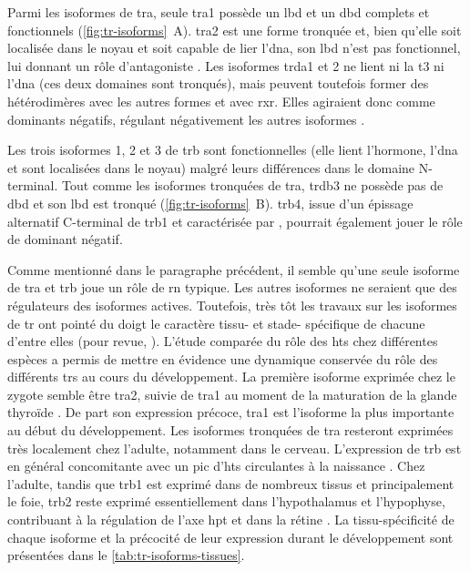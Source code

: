 \documentclass[../main.tex]{subfiles}
\begin{document}
Parmi les isoformes de \gls{tra}, seule \gls{tra}1 possède un \gls{lbd} et un \gls{dbd} complets et fonctionnels (\autoref{fig:tr-isoforms}~A).
\gls{tra}2 est une forme tronquée et, bien qu'elle soit localisée dans le noyau et soit capable de lier l'\gls{dna}, son \gls{lbd} n'est pas fonctionnel, lui donnant un rôle d'antagoniste \citep{Chassande1997}.
Les isoformes \gls{trda}1 et 2 ne lient ni la \gls{t3} ni l'\gls{dna} (ces deux domaines sont tronqués), mais peuvent toutefois former des hétérodimères avec les autres formes et avec \gls{rxr}.
Elles agiraient donc comme dominants négatifs, régulant négativement les autres isoformes \citep{Plateroti2001}.



Les trois isoformes 1, 2 et 3 de \gls{trb} sont fonctionnelles (elle lient l'hormone, l'\gls{dna} et sont localisées dans le noyau) malgré leurs différences dans le domaine N-terminal.
Tout comme les isoformes tronquées de \gls{tra}, \gls{trdb}3 ne possède pas de \gls{dbd} et son \gls{lbd} est tronqué (\autoref{fig:tr-isoforms}~B).
\gls{trb}4, issue d'un épissage alternatif C-terminal de \gls{trb}1 et caractérisée par \citet{Tagami2010}, pourrait également jouer le rôle de dominant négatif.

Comme mentionné dans le paragraphe précédent, il semble qu'une seule isoforme de \gls{tra} et \gls{trb} joue un rôle de \gls{rn} typique.
Les autres isoformes ne seraient que des régulateurs des isoformes actives.
Toutefois, très tôt les travaux sur les isoformes de \gls{tr} ont pointé du doigt le caractère tissu- et stade- spécifique de chacune d'entre elles (pour revue, \citealp{Flamant2003,Cheng2010}).
L'étude comparée du rôle des \glspl{ht} chez différentes espèces a permis de mettre en évidence une dynamique conservée du rôle des différents \glspl{tr} au cours du développement.
La première isoforme exprimée chez le zygote semble être \gls{tra}2, suivie de \gls{tra}1 au moment de la maturation de la glande thyroïde \citep{Strait1991}.
De part son expression précoce, \gls{tra}1 est l'isoforme la plus importante au début du développement.
Les isoformes tronquées de \gls{tra} resteront exprimées très localement chez l'adulte, notamment dans le cerveau.
L'expression de \gls{trb} est en général concomitante avec un pic d'\glspl{ht} circulantes à la naissance \citep{Keijzer2007}.
Chez l'adulte, tandis que \gls{trb}1 est exprimé dans de nombreux tissus et principalement le foie, \gls{trb}2 reste exprimé essentiellement dans l'hypothalamus et l'hypophyse, contribuant à la régulation de l'axe \gls{hpt} \citep{Schwartz1994} et dans la rétine \citep{Abel1999}.
La tissu-spécificité de chaque isoforme et la précocité de leur expression durant le développement sont présentées dans le \autoref{tab:tr-isoforms-tissues}.
\end{document}
